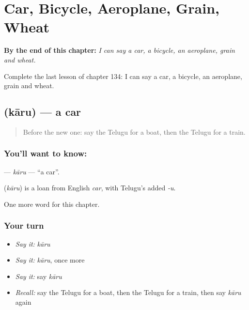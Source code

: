 
\chapter{Car, Bicycle, Aeroplane, Grain, Wheat}
\label{ch:te-car-bicycle-aeroplane-grain-wheat}

\begin{chapteropening}
\textbf{By the end of this chapter:} \emph{I can say a car, a bicycle, an aeroplane, grain and wheat.}

Complete the last lesson of chapter 134: I can say a car, a bicycle, an aeroplane, grain and wheat.
\end{chapteropening}

\section[\texorpdfstring{\te{కారు} (kāru)}{కారు (kāru)}]{ (kāru) — a car}

\label{lesson:TE-C134-karu}



\begin{quote}
Before the new one: say the Telugu for a boat, then the Telugu for a train.
\end{quote}

\subsection*{You'll want to know: }
\textbf{} — \emph{kāru} — \textquotedblleft{}a car\textquotedblright{}.

\begin{cousinweb}
\textbf{} (\emph{kāru}) is a loan from English \emph{car}, with Telugu's added \emph{-u}.
\end{cousinweb}

\begin{grammarlens}[title={What you've built}]
One more word for this chapter.
\end{grammarlens}

\subsection*{Your turn}
\begin{itemize}
\raggedright
  \item \emph{Say it:} \emph{kāru}
  \item \emph{Say it:} \emph{kāru}, once more
  \item \emph{Say it:} say \emph{kāru}
  \item \emph{Recall:} say the Telugu for a boat, then the Telugu for a train, then say \emph{kāru} again
\end{itemize}

